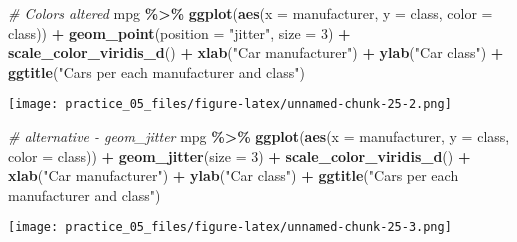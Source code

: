 \documentclass[
]{article}
\newenvironment{Shaded}{\begin{snugshade}}{\end{snugshade}}
\newcommand{\AttributeTok}[1]{\textcolor[rgb]{0.13,0.29,0.53}{#1}}
\newcommand{\CommentTok}[1]{\textcolor[rgb]{0.56,0.35,0.01}{\textit{#1}}}
\newcommand{\DecValTok}[1]{\textcolor[rgb]{0.00,0.00,0.81}{#1}}
\newcommand{\FunctionTok}[1]{\textcolor[rgb]{0.13,0.29,0.53}{\textbf{#1}}}
\newcommand{\NormalTok}[1]{#1}
\newcommand{\SpecialCharTok}[1]{\textcolor[rgb]{0.81,0.36,0.00}{\textbf{#1}}}
\newcommand{\StringTok}[1]{\textcolor[rgb]{0.31,0.60,0.02}{#1}}
\begin{document}
\begin{Shaded}
\begin{Highlighting}[]
\CommentTok{\#   Colors altered}
\NormalTok{mpg }\SpecialCharTok{\%\textgreater{}\%} 
  \FunctionTok{ggplot}\NormalTok{(}\FunctionTok{aes}\NormalTok{(}\AttributeTok{x =}\NormalTok{ manufacturer,}
             \AttributeTok{y =}\NormalTok{ class,}
             \AttributeTok{color =}\NormalTok{ class)) }\SpecialCharTok{+}
  \FunctionTok{geom\_point}\NormalTok{(}\AttributeTok{position =} \StringTok{"jitter"}\NormalTok{,}
             \AttributeTok{size =} \DecValTok{3}\NormalTok{) }\SpecialCharTok{+} 
  \FunctionTok{scale\_color\_viridis\_d}\NormalTok{() }\SpecialCharTok{+}
  \FunctionTok{xlab}\NormalTok{(}\StringTok{"Car manufacturer"}\NormalTok{) }\SpecialCharTok{+}
  \FunctionTok{ylab}\NormalTok{(}\StringTok{"Car class"}\NormalTok{) }\SpecialCharTok{+}
  \FunctionTok{ggtitle}\NormalTok{(}\StringTok{"Cars per each manufacturer and class"}\NormalTok{)}
\end{Highlighting}
\end{Shaded}

\texttt{[image: practice\_05\_files/figure-latex/unnamed-chunk-25-2.png]}

\begin{Shaded}
\begin{Highlighting}[]
\CommentTok{\#   alternative {-} geom\_jitter}
\NormalTok{mpg }\SpecialCharTok{\%\textgreater{}\%} 
  \FunctionTok{ggplot}\NormalTok{(}\FunctionTok{aes}\NormalTok{(}\AttributeTok{x =}\NormalTok{ manufacturer,}
             \AttributeTok{y =}\NormalTok{ class,}
             \AttributeTok{color =}\NormalTok{ class)) }\SpecialCharTok{+}
  \FunctionTok{geom\_jitter}\NormalTok{(}\AttributeTok{size =} \DecValTok{3}\NormalTok{) }\SpecialCharTok{+} 
  \FunctionTok{scale\_color\_viridis\_d}\NormalTok{() }\SpecialCharTok{+}
  \FunctionTok{xlab}\NormalTok{(}\StringTok{"Car manufacturer"}\NormalTok{) }\SpecialCharTok{+}
  \FunctionTok{ylab}\NormalTok{(}\StringTok{"Car class"}\NormalTok{) }\SpecialCharTok{+}
  \FunctionTok{ggtitle}\NormalTok{(}\StringTok{"Cars per each manufacturer and class"}\NormalTok{)}
\end{Highlighting}
\end{Shaded}

\texttt{[image: practice\_05\_files/figure-latex/unnamed-chunk-25-3.png]}
\end{document}

